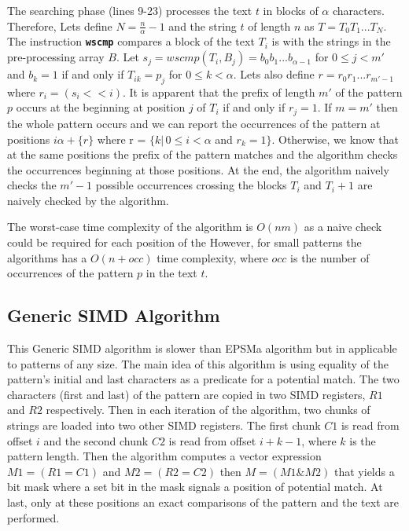 The searching phase (lines 9-23) processes the text $t$ in blocks of $\alpha$ characters. Therefore, Lets define  $N = \frac{n}{\alpha} - 1$ and the string $t$ of length $n$ as $T=T_0 T_1...T_N$. The instruction \texttt{\textbf{wscmp}} compares a block of the text $T_i$ is with the strings in the pre-processing array $B$. Let $s_j = wscmp(T_i, B_j) = b_0 b_1 ...b_{\alpha-1}$ for $0 \leq j < m'$ and $b_k = 1$ if and only if $T_{ik} = p_j$ for $0 \leq k < \alpha$. Lets also define $r = r_0 r_1...r_{m'-1}$ where $r_i = (s_i << i)$. It is apparent that the prefix of length $m'$ of the pattern $p$
occurs at the beginning at position $j$ of $T_i$ if and only if $r_j = 1$. If $m = m'$ then the whole pattern occurs and we can report the occurrences of the pattern at positions $i\alpha + \{r\}$ where r = $\{k | \, 0 \leq i < \alpha$ and $r_k = 1\}$. Otherwise, we know that at the same positions the prefix of the pattern matches and the algorithm checks the occurrences beginning at those positions. At the end, the algorithm naively checks the $m' - 1$ possible occurrences crossing the blocks $T_i$ and $T_i+1$ are naively checked by the algorithm.

The worst-case time complexity of the algorithm is $O(nm)$ as a naive check could be required for each position of the  However, for small patterns the algorithms has a $O(n+occ)$ time complexity, where $occ$ is the number of occurrences of
the pattern $p$ in the text $t$.

\subsection{Generic SIMD Algorithm}
This Generic SIMD algorithm \cite{simdalgo} is slower than EPSMa algorithm but in applicable to patterns of any size. The main idea of this algorithm is using equality of the pattern's initial and last characters as a predicate for a potential match. The two characters (first and last) of the pattern are copied in two SIMD registers, $R1$ and $R2$ respectively. Then in each iteration of the algorithm, two chunks of strings are loaded into two other SIMD registers. The first chunk $C1$ is read from offset $i$ and the second chunk $C2$ is read from offset $i + k - 1$, where $k$ is the pattern length. Then the algorithm computes a vector expression $M1 = (R1 = C1)$ and $M2 = (R2 = C2)$ then $M = (M1 \& M2)$ that yields a bit mask where a set bit in the mask signals a position of potential match. At last, only at these positions an exact comparisons of the pattern and the text are performed.

